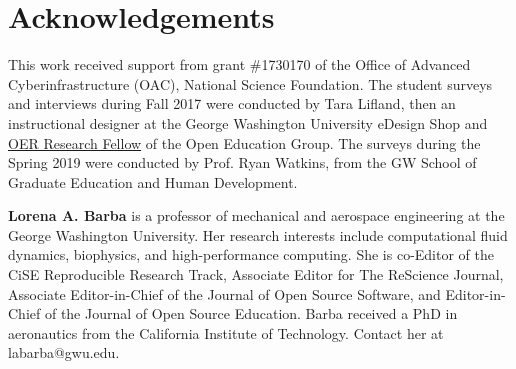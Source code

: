 \documentclass[10pt,journal,compsoc]{IEEEtran}
\begin{document}
\section*{Acknowledgements}

This work received support from grant \#1730170  of the Office of Advanced Cyberinfrastructure (OAC), National Science Foundation. 
The student surveys and interviews during Fall 2017 were conducted by Tara Lifland, then an instructional designer at the  George Washington University eDesign Shop and \href{http://openedgroup.org/fellowship}{OER Research Fellow} of the Open Education Group. 
The surveys during the Spring 2019 were conducted by Prof. Ryan Watkins, from the GW School of Graduate Education and Human Development. 

\bigskip

\textbf{Lorena A. Barba} is a professor of mechanical and aerospace engineering at the George Washington University. Her research interests include computational fluid dynamics, biophysics, and high-performance computing. She is co-Editor of the CiSE Reproducible Research Track, Associate Editor for The ReScience Journal, Associate Editor-in-Chief of the Journal of Open Source Software, and Editor-in-Chief of the Journal of Open Source Education. Barba received a PhD in aeronautics from the California Institute of Technology. Contact her at labarba@gwu.edu.



%
\end{document}
